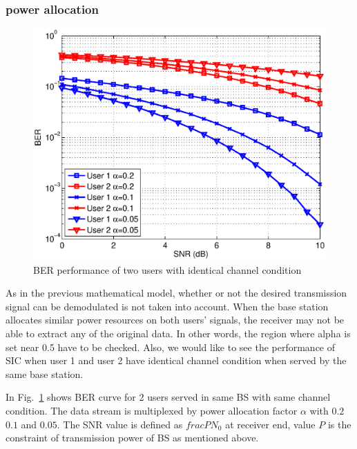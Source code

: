 \subsubsection{power allocation}
\begin{figure}[t]
\begin{center}
\includegraphics[width=0.95\columnwidth ,angle=0]{figure/snrVSber.eps}
\caption{BER performance of two users with identical channel condition}
\label{fig_sim_snrVSber}
\end{center}
\end{figure}
As in the previous mathematical model, whether or not the desired transmission
signal can be demodulated is not taken into account.
When the base station allocates similar power resources on both users' signals,
the receiver may not be able to extract any of the original data.
In other words, the region where alpha is set near 0.5 have to be checked.
Also, we would like to see the performance of SIC when user 1 and user 2 have
identical channel condition when served by the same base station.

In Fig.~\ref{fig_sim_snrVSber} shows BER curve for 2 users served in same BS 
with same channel condition.
The data stream is multiplexed by power allocation factor $\alpha$ with $0.2$
$0.1$ and $0.05$.
The SNR value is defined as $frac{P}{N_0}$ at receiver end, value $P$ is the
constraint of transmission power of BS as mentioned above.

